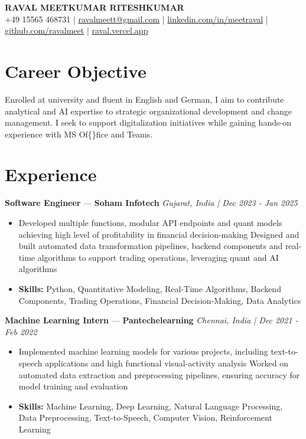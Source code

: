 \documentclass[a4paper,10pt]{article}
\begin{document}
\begin{center}
  {\Large\bfseries RAVAL MEETKUMAR RITESHKUMAR}\\[2pt]
  {\small +49 15565 468731 \;|\; \href{mailto:ravalmeett@gmail.com}{ravalmeett@gmail.com} \;|\; \href{https://www.linkedin.com/in/meetraval/}{linkedin.com/in/meetraval} \;|\; \href{https://github.com/ravalmeet}{github.com/ravalmeet} \;|\; \href{https://raval.vercel.app/}{raval.vercel.app}}
\end{center}
\vspace{-3pt}

\section*{Career Objective}
Enrolled at university and fluent in English and German, I aim to contribute analytical and AI expertise to strategic organizational development and change management. I seek to support digitalization initiatives while gaining hands-on experience with MS Of\{\}fice and Teams.\par

\section*{Experience}
\textbf{Software Engineer} — \textbf{Soham Infotech} \hfill \textit{Gujarat, India \;|\; Dec 2023 - Jan 2025}\par
\vspace{1pt}
\begin{itemize}
  \item Developed multiple functions, modular API endpoints and quant models achieving high level of profitability in financial decision-making Designed and built automated data transformation pipelines, backend components and real-time algorithms to support trading operations, leveraging quant and AI algorithms
  \item \textbf{Skills:} Python, Quantitative Modeling, Real-Time Algorithms, Backend Components, Trading Operations, Financial Decision-Making, Data Analytics
\end{itemize}
\vspace{3pt}
\textbf{Machine Learning Intern} — \textbf{Pantechelearning} \hfill \textit{Chennai, India \;|\; Dec 2021 - Feb 2022}\par
\vspace{1pt}
\begin{itemize}
  \item Implemented machine learning models for various projects, including text-to-speech applications and high functional visual-activity analysis Worked on automated data extraction and preprocessing pipelines, ensuring accuracy for model training and evaluation
  \item \textbf{Skills:} Machine Learning, Deep Learning, Natural Language Processing, Data Preprocessing, Text-to-Speech, Computer Vision, Reinforcement Learning
\end{itemize}
\end{document}
